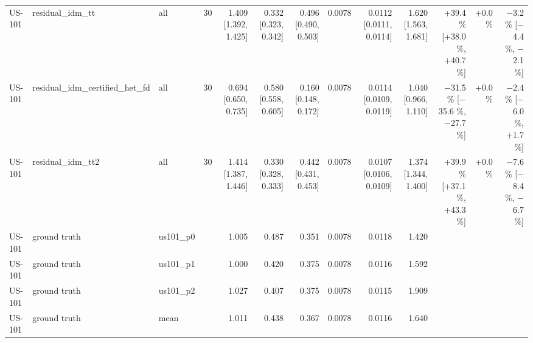 \begin{table}[htbp]
{\begin{tabular}{lllrrrrrrrrrr}
US-101 & residual\_idm\_tt & all & 30 & 1.409 [1.392, 1.425] & 0.332 [0.323, 0.342] & 0.496 [0.490, 0.503] & 0.0078 & 0.0112 [0.0111, 0.0114] & 1.620 [1.563, 1.681] & +39.4 \% [+38.0 \%, +40.7 \%] & +0.0 \% & $-$3.2 \% [$-$4.4 \%, $-$2.1 \%] \\
US-101 & residual\_idm\_certified\_het\_fd & all & 30 & 0.694 [0.650, 0.735] & 0.580 [0.558, 0.605] & 0.160 [0.148, 0.172] & 0.0078 & 0.0114 [0.0109, 0.0119] & 1.040 [0.966, 1.110] & $-$31.5 \% [$-$35.6 \%, $-$27.7 \%] & +0.0 \% & $-$2.4 \% [$-$6.0 \%, +1.7 \%] \\
US-101 & residual\_idm\_tt2 & all & 30 & 1.414 [1.387, 1.446] & 0.330 [0.328, 0.333] & 0.442 [0.431, 0.453] & 0.0078 & 0.0107 [0.0106, 0.0109] & 1.374 [1.344, 1.400] & +39.9 \% [+37.1 \%, +43.3 \%] & +0.0 \% & $-$7.6 \% [$-$8.4 \%, $-$6.7 \%] \\
US-101 & ground truth & us101\_p0 &  & 1.005 & 0.487 & 0.351 & 0.0078 & 0.0118 & 1.420 &  &  &  \\
US-101 & ground truth & us101\_p1 &  & 1.000 & 0.420 & 0.375 & 0.0078 & 0.0116 & 1.592 &  &  &  \\
US-101 & ground truth & us101\_p2 &  & 1.027 & 0.407 & 0.375 & 0.0078 & 0.0115 & 1.909 &  &  &  \\
US-101 & ground truth & mean &  & 1.011 & 0.438 & 0.367 & 0.0078 & 0.0116 & 1.640 &  &  &  \\
\bottomrule
\end{tabular}
}
\end{table}
